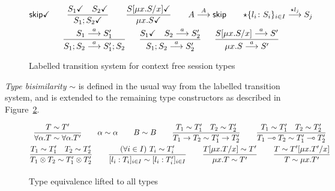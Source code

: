 \begin{figure}[h!]
\vspace*{-4mm}
  \begin{gather*}
    \DONE{\skipk}
    \qquad
    \frac{\DONE{S_1} \quad \DONE{S_2}}{\DONE{S_1; S_2}}
    \qquad
    \frac{\DONE{S[\mu x.S/x]}}{\DONE{\mu x.S}}
    \qquad
    {A \LTSderives[A] \skipk }
    \qquad
    {\star\{l_i\colon S_i\}_{i\in I} \LTSderives[\star l_j] S_j}
    \\
    \frac{S_1 \LTSderives S_1'}{S_1; S_2 \LTSderives S_1';S_2}
    \quad\;\;
    \frac{\DONE{S_1} \quad S_2 \LTSderives S_2'}{S_1; S_2 \LTSderives S_2'}
    \quad\;\;
    \frac{S[\mu x.S/x] \LTSderives S'}{\mu x.S \LTSderives S'}
  \end{gather*}
  \vspace*{-4mm}
  \caption{Labelled transition system for context free session types}
  \label{fig:lts}
\end{figure}

{\it Type bisimilarity} $\sim$ is defined in the usual way from the labelled transition system, and is extended to the remaining type constructors as described in Figure~\ref{fig:type-equivalence-lifted}.

\begin{figure}[h!]
\vspace*{-4mm}
  \begin{gather*}
    \frac
    {T \TypeEquiv T'}
    { \forall \alpha.T \TypeEquiv \forall \alpha. T'}
    \qquad
    \alpha \TypeEquiv \alpha
    \qquad
    B \TypeEquiv B
    \qquad
    \frac
    { T_1 \TypeEquiv T_1' \quad T_2 \TypeEquiv T_2'}
    {T_1 \to T_2 \TypeEquiv T_1' \to T_2'}
    \qquad
    \frac
    { T_1 \TypeEquiv T_1' \quad T_2 \TypeEquiv T_2'}
    { T_1 \multimap T_2 \TypeEquiv T_1' \multimap T_2'}
    \\\smallskip
    \frac
    {T_1 \TypeEquiv T_1' \quad T_2 \TypeEquiv T_2'}
    { T_1 \otimes T_2 \TypeEquiv T_1' \otimes T_2'}
    \qquad
    \frac
    {(\forall i\in I)~ T_i \TypeEquiv T_i'}
    { [l_i:T_i]_{i\in I} \TypeEquiv [l_i:T_i']_{i\in I}}
    \qquad
    \frac
    { T\subs{\mu x.T}x \TypeEquiv T'}
    { \mu x.T \TypeEquiv T'}
    \qquad
    \frac
    { T \TypeEquiv T'\subs{\mu x.T'}x}
    { T \TypeEquiv \mu x.T'}
  \end{gather*}
  \vspace*{-4mm}
  \caption{Type equivalence lifted to all types}
  \label{fig:type-equivalence-lifted}
\end{figure}